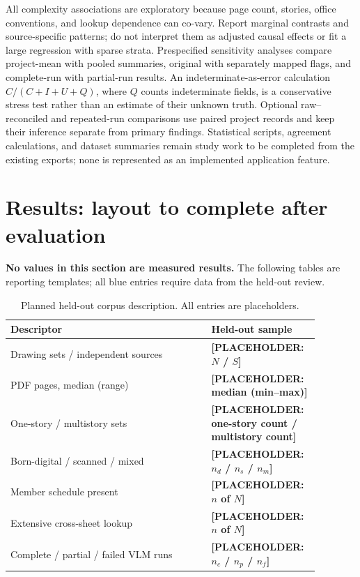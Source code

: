 \documentclass[11pt]{article}
\newcommand{\todo}[1]{\textcolor{blue!65!black}{\textbf{[PLACEHOLDER: #1]}}}
\begin{document}
All complexity associations are exploratory because page count, stories, office conventions, and lookup dependence can co-vary. Report marginal contrasts and source-specific patterns; do not interpret them as adjusted causal effects or fit a large regression with sparse strata. Prespecified sensitivity analyses compare project-mean with pooled summaries, original with separately mapped flags, and complete-run with partial-run results. An indeterminate-as-error calculation $C/(C+I+U+Q)$, where $Q$ counts indeterminate fields, is a conservative stress test rather than an estimate of their unknown truth. Optional raw--reconciled and repeated-run comparisons use paired project records and keep their inference separate from primary findings. Statistical scripts, agreement calculations, and dataset summaries remain study work to be completed from the existing exports; none is represented as an implemented application feature.

\section{Results: layout to complete after evaluation}
\noindent\textbf{No values in this section are measured results.} The following tables are reporting templates; all blue entries require data from the held-out review.

\begin{table}[ht]
\centering
\caption{Planned held-out corpus description. All entries are placeholders.}
\label{tab:corpus}
\begin{tabular}{@{}p{0.61\linewidth}p{0.27\linewidth}@{}}
\toprule
Descriptor & Held-out sample \\
\midrule
Drawing sets / independent sources & \todo{$N$ / $S$} \\
PDF pages, median (range) & \todo{median (min--max)} \\
One-story / multistory sets & \todo{one-story count / multistory count} \\
Born-digital / scanned / mixed & \todo{$n_d$ / $n_s$ / $n_m$} \\
Member schedule present & \todo{$n$ of $N$} \\
Extensive cross-sheet lookup & \todo{$n$ of $N$} \\
Complete / partial / failed VLM runs & \todo{$n_c$ / $n_p$ / $n_f$} \\
\bottomrule
\end{tabular}
\end{table}
\end{document}
